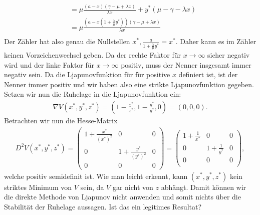 \begin{solution}
\begin{align*}
  &=\mu \frac{(a-x)(\gamma - \mu + \lambda x)}{\lambda x} + y^*(\mu - \gamma - \lambda x) \\
  &= \mu \frac{(a-x(1+\frac{\lambda}{\mu} y^*))(\gamma - \mu + \lambda x)}{\lambda x} \\
\end{align*}
Der Zähler hat also genau die Nullstellen $x^*, \frac{a}{1 + \frac{\lambda}{\mu}y^*} = x^*$.
Daher kann es im Zähler keinen Vorzeichenwechsel geben. Da der rechte Faktor für $x \to \infty$ sicher negativ wird
und der linke Faktor für $x \to \infty$ positiv, muss der Nenner insgesamt immer negativ sein.
Da die Ljapunovfunktion für für positive $x$ definiert ist, ist der Nenner immer positiv
und wir haben also eine strikte Ljapunovfunktion gegeben. \\
Setzen wir nun die Ruhelage in die Ljapunovfunktion ein:
\begin{align*}
  \nabla V(x^*,y^*,z^*) = \left(1 - \frac{x^*}{x^*}, 1 - \frac{y^*}{y^*}, 0\right) = (0,0,0).
\end{align*}
Betrachten wir nun die Hesse-Matrix
\begin{align*}
  D^2 V(x^*,y^*,z^*) = \begin{pmatrix}
    1 + \frac{x^*}{(x^*)^2} & 0 & 0 \\
    0 & 1 + \frac{y^*}{(y^*)^2} & 0 \\
    0 & 0 & 0
  \end{pmatrix}
  = \begin{pmatrix}
    1 + \frac{1}{x^*} & 0 & 0\\
    0 & 1 + \frac{1}{y^*} & 0 \\
    0 & 0 & 0 \\
  \end{pmatrix},
\end{align*}
welche positiv semidefinit ist. Wie man leicht erkennt, kann $(x^*,y^*,z^*)$ kein
striktes Minimum von $V$ sein, da $V$ gar nicht von $z$ abhängt. Damit können wir
die direkte Methode von Ljapunov nicht anwenden und somit nichts über die Stabilität
der Ruhelage aussagen. Ist das ein legitimes Resultat?
\end{solution}
